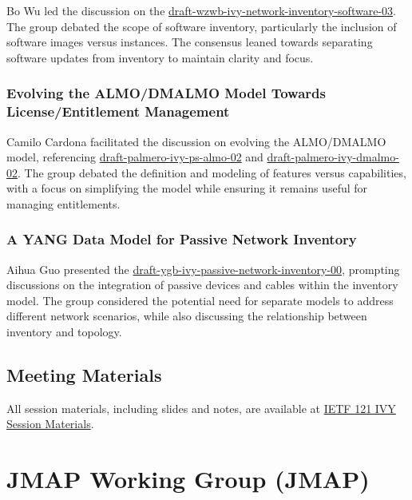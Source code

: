 \documentclass{article}
\begin{document}
Bo Wu led the discussion on the \href{https://datatracker.ietf.org/doc/html/draft-wzwb-ivy-network-inventory-software-03}{draft-wzwb-ivy-network-inventory-software-03}. The group debated the scope of software inventory, particularly the inclusion of software images versus instances. The consensus leaned towards separating software updates from inventory to maintain clarity and focus.

\subsubsection{Evolving the ALMO/DMALMO Model Towards License/Entitlement Management}

Camilo Cardona facilitated the discussion on evolving the ALMO/DMALMO model, referencing \href{https://datatracker.ietf.org/doc/html/draft-palmero-ivy-ps-almo-02}{draft-palmero-ivy-ps-almo-02} and \href{https://datatracker.ietf.org/doc/html/draft-palmero-ivy-dmalmo-02}{draft-palmero-ivy-dmalmo-02}. The group debated the definition and modeling of features versus capabilities, with a focus on simplifying the model while ensuring it remains useful for managing entitlements.

\subsubsection{A YANG Data Model for Passive Network Inventory}

Aihua Guo presented the \href{https://datatracker.ietf.org/doc/html/draft-ygb-ivy-passive-network-inventory-00}{draft-ygb-ivy-passive-network-inventory-00}, prompting discussions on the integration of passive devices and cables within the inventory model. The group considered the potential need for separate models to address different network scenarios, while also discussing the relationship between inventory and topology.

\subsection{Meeting Materials}

All session materials, including slides and notes, are available at \href{https://datatracker.ietf.org/meeting/121/session/ivy}{IETF 121 IVY Session Materials}.




\newpage

\section{JMAP Working Group (JMAP)}
\end{document}
